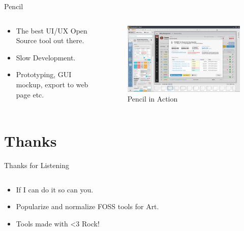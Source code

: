 \documentclass[presentation]{beamer}
\begin{document}
\begin{frame}[label={sec:org7b73c4b}]{Pencil}
\begin{columns}
\begin{column}{0.4\columnwidth}
\begin{itemize}
\item The best UI/UX Open Source tool out there.
\item Slow Development.
\item Prototyping, GUI mockup, export to web page etc.
\end{itemize}
\end{column}
\begin{column}{0.6\columnwidth}
\begin{figure}[htbp]
\centering
\includegraphics[width=.9\linewidth]{./images/pencil.png}
\caption{Pencil in Action}
\end{figure}
\end{column}
\end{columns}
\end{frame}
\section*{Thanks}
\label{sec:orgea97927}
\begin{frame}[label={sec:orgc6ee0a7}]{Thanks for Listening}
\begin{columns}
\begin{column}{0.6\columnwidth}
\begin{itemize}
\item If I can do it so can you.
\item Popularize and normalize FOSS tools for Art.
\item Tools made with \alert{\alert{<3}} Rock!
\end{itemize}
\end{column}
\end{columns}
\end{frame}
\end{document}
